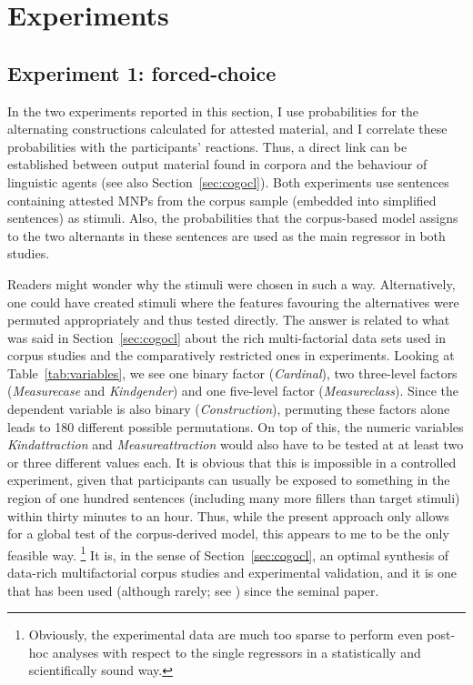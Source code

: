 \section{Experiments}
\label{sec:experimental}

\subsection{Experiment 1: forced-choice}
\label{sec:exp:fc}

In the two experiments reported in this section, I use probabilities for the alternating constructions calculated for attested material, and I correlate these probabilities with the participants' reactions.
Thus, a direct link can be established between output material found in corpora and the behaviour of linguistic agents (see also Section~\ref{sec:cogocl}).
Both experiments use sentences containing attested MNPs from the corpus sample (embedded into simplified sentences) as stimuli.
Also, the probabilities that the corpus-based model assigns to the two alternants in these sentences are used as the main regressor in both studies.

Readers might wonder why the stimuli were chosen in such a way.
Alternatively, one could have created stimuli where the features favouring the alternatives were permuted appropriately and thus tested directly.
The answer is related to what was said in Section~\ref{sec:cogocl} about the rich multi-factorial data sets used in corpus studies and the comparatively restricted ones in experiments.
Looking at Table~\ref{tab:variables}, we see one binary factor (\textit{Cardinal}), two three-level factors (\textit{Measurecase} and \textit{Kindgender}) and one five-level factor (\textit{Measureclass}).
Since the dependent variable is also binary (\textit{Construction}), permuting these factors alone leads to 180 different possible permutations.
On top of this, the numeric variables \textit{Kindattraction} and \textit{Measureattraction} would also have to be tested at at least two or three different values each.
It is obvious that this is impossible in a controlled experiment, given that participants can usually be exposed to something in the region of one hundred sentences (including many more fillers than target stimuli) within thirty minutes to an hour.
Thus, while the present approach only allows for a global test of the corpus-derived model, this appears to me to be the only feasible way.%
\footnote{Obviously, the experimental data are much too sparse to perform even post-hoc analyses with respect to the single regressors in a statistically and scientifically sound way.}
It is, in the sense of Section~\ref{sec:cogocl}, an optimal synthesis of data-rich multifactorial corpus studies and experimental validation, and it is one that has been used (although rarely; see \citealp[3--4]{DivjakEa2016a}) since the seminal \citet{BresnanEa2007} paper.

